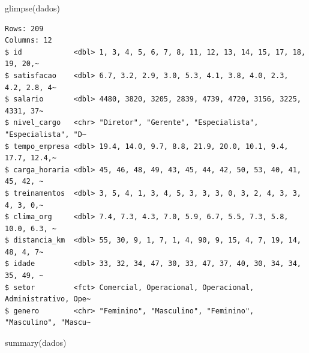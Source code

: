 \documentclass[
  letterpaper,
  DIV=11,
  numbers=noendperiod]{scrartcl}
\newenvironment{Shaded}{\begin{snugshade}}{\end{snugshade}}
\newcommand{\CommentTok}[1]{\textcolor[rgb]{0.37,0.37,0.37}{#1}}
\newcommand{\DocumentationTok}[1]{\textcolor[rgb]{0.37,0.37,0.37}{\textit{#1}}}
\newcommand{\FunctionTok}[1]{\textcolor[rgb]{0.28,0.35,0.67}{#1}}
\newcommand{\NormalTok}[1]{\textcolor[rgb]{0.00,0.23,0.31}{#1}}
\newcommand{\OtherTok}[1]{\textcolor[rgb]{0.00,0.23,0.31}{#1}}
\newcommand{\SpecialCharTok}[1]{\textcolor[rgb]{0.37,0.37,0.37}{#1}}
\begin{document}
\begin{Shaded}
\end{Shaded}

\begin{Shaded}
\begin{Highlighting}[]
\FunctionTok{glimpse}\NormalTok{(dados)}
\end{Highlighting}
\end{Shaded}

\begin{verbatim}
Rows: 209
Columns: 12
$ id            <dbl> 1, 3, 4, 5, 6, 7, 8, 11, 12, 13, 14, 15, 17, 18, 19, 20,~
$ satisfacao    <dbl> 6.7, 3.2, 2.9, 3.0, 5.3, 4.1, 3.8, 4.0, 2.3, 4.2, 2.8, 4~
$ salario       <dbl> 4480, 3820, 3205, 2839, 4739, 4720, 3156, 3225, 4331, 37~
$ nivel_cargo   <chr> "Diretor", "Gerente", "Especialista", "Especialista", "D~
$ tempo_empresa <dbl> 19.4, 14.0, 9.7, 8.8, 21.9, 20.0, 10.1, 9.4, 17.7, 12.4,~
$ carga_horaria <dbl> 45, 46, 48, 49, 43, 45, 44, 42, 50, 53, 40, 41, 45, 42, ~
$ treinamentos  <dbl> 3, 5, 4, 1, 3, 4, 5, 3, 3, 3, 0, 3, 2, 4, 3, 3, 4, 3, 0,~
$ clima_org     <dbl> 7.4, 7.3, 4.3, 7.0, 5.9, 6.7, 5.5, 7.3, 5.8, 10.0, 6.3, ~
$ distancia_km  <dbl> 55, 30, 9, 1, 7, 1, 4, 90, 9, 15, 4, 7, 19, 14, 48, 4, 7~
$ idade         <dbl> 33, 32, 34, 47, 30, 33, 47, 37, 40, 30, 34, 34, 35, 49, ~
$ setor         <fct> Comercial, Operacional, Operacional, Administrativo, Ope~
$ genero        <chr> "Feminino", "Masculino", "Feminino", "Masculino", "Mascu~
\end{verbatim}

\begin{Shaded}
\begin{Highlighting}[]
\FunctionTok{summary}\NormalTok{(dados)}
\end{Highlighting}
\end{Shaded}
\end{document}
